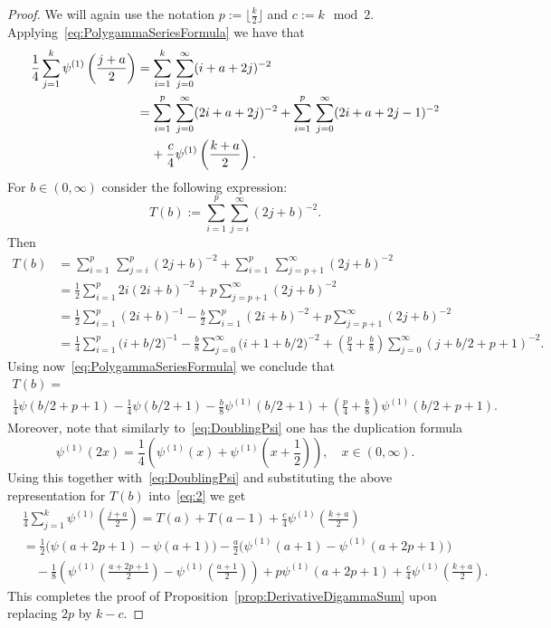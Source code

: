 \documentclass[AHL,Unicode,longabstracts,published]{cedram}
\begin{document}
\begin{proof}
We will again use the notation $p:=\lfloor\frac{k}{2}\rfloor$ and $c:= k\mod 2$. Applying~\eqref{eq:PolygammaSeriesFormula} we have that
\begin{equation}\label{eq:2}
\begin{aligned}
\frac14\sum\limits_{j=1}^k\psi^{(1)}\left(\frac{j+a}{2}\right)&=\sum\limits_{i=1}^k\,\sum\limits_{j=0}^{\infty}(i+a+2j)^{-2}\\
&=\sum\limits_{i=1}^p\,\sum\limits_{j=0}^{\infty}(2i+a+2j)^{-2}+\sum\limits_{i=1}^p\,\sum\limits_{j=0}^{\infty}(2i+a+2j-1)^{-2}\\
&\mkern20mu +\frac{c}{4}\psi^{(1)}\left(\frac{k+a}{2}\right).
\end{aligned}
\end{equation}
For $b\in(0,\infty)$ consider the following expression:
\[
T(b):=\sum\limits_{i=1}^p\sum\limits_{j=i}^{\infty}(2j+b)^{-2}.
\]
Then
\begin{align*}
T(b)&=\sum\limits_{i=1}^p\,\sum\limits_{j=i}^{p}(2j+b)^{-2}+\sum\limits_{i=1}^p\,\sum\limits_{j=p+1}^{\infty}(2j+b)^{-2}\\
&=\frac12\sum\limits_{i=1}^p 2i(2i+b)^{-2}+p\sum\limits_{j=p+1}^{\infty}(2j+b)^{-2}\\
&=\frac12\sum\limits_{i=1}^p(2i+b)^{-1}-\frac{b}{2}\sum\limits_{i=1}^p(2i+b)^{-2}+p\sum\limits_{j=p+1}^{\infty}(2j+b)^{-2}\\
&=\frac14\sum\limits_{i=1}^p\big(i+b/2\big)^{-1}-\frac{b}{8}\sum\limits_{j=0}^\infty\big(i+1+b/2\big)^{-2}+\left(\frac{p}{4}+\frac{b}{8}\right)\sum\limits_{j=0}^{\infty}\left(j+b/2+p+1\right)^{-2}.
\end{align*}
Using now~\eqref{eq:PolygammaSeriesFormula} we conclude that
\begin{multline*}
T(b) =\\
\frac{1}{4}\psi(b/2+p+1)-\frac{1}{4}\psi(b/2+1)-\frac{b}{8}\psi^{(1)}(b/2+1)+\left(\frac{p}{4}+\frac{b}{8}\right)\psi^{(1)}\left(b/2+p+1\right).
\end{multline*}
Moreover, note that similarly to~\eqref{eq:DoublingPsi} one has the duplication formula
\[
\psi^{(1)}(2x) = \frac{1}{4}\left(\psi^{(1)}(x)+\psi^{(1)}\left(x+\frac{1}{2}\right)\right),\quad x\in(0,\infty).
\]
Using this together with~\eqref{eq:DoublingPsi} and substituting the above representation for $T(b)$ into~\eqref{eq:2} we get
\begin{align*}
&\frac14\sum\limits_{j=1}^k\psi^{(1)}\left(\frac{j+a}{2}\right)=T(a)+T(a-1)+\frac{c}{4}\psi^{(1)}\left(\frac{k+a}{2}\right)\\
&=\frac{1}{2}\big(\psi(a+2p+1)-\psi(a+1)\big)-\frac{a}{2}\big(\psi^{(1)}(a+1)-\psi^{(1)}(a+2p+1)\big)\\
&\quad -\frac{1}{8}\left(\psi^{(1)}\left(\frac{a+2p+1}{2}\right)-\psi^{(1)}\left(\frac{a+1}{2}\right)\right)+p\psi^{(1)}(a+2p+1)+\frac{c}{4}\psi^{(1)}\left(\frac{k+a}{2}\right).
\end{align*}
This completes the proof of Proposition~\ref{prop:DerivativeDigammaSum} upon replacing $2p$ by $k-c$.
\end{proof}
\end{document}
